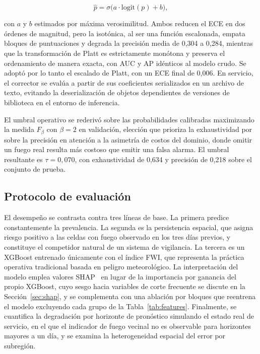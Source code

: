 \documentclass[11pt,a4paper]{article}
\begin{document}
\begin{equation}
\hat{p} = \sigma\!\bigl(a \cdot \mathrm{logit}(p) + b\bigr),
\label{eq:platt}
\end{equation}

\noindent con $a$ y $b$ estimados por máxima verosimilitud. Ambos reducen
el ECE en dos órdenes de magnitud, pero la isotónica, al ser una función
escalonada, empata bloques de puntuaciones y degrada la precisión media de
0,304 a 0,284, mientras que la transformación de Platt es estrictamente
monótona y preserva el ordenamiento de manera exacta, con AUC y AP
idénticos al modelo crudo. Se adoptó por lo tanto el escalado de Platt, con
un ECE final de 0,006. En servicio, el corrector se evalúa a partir de sus
coeficientes serializados en un archivo de texto, evitando la
deserialización de objetos dependientes de versiones de biblioteca en el
entorno de inferencia.

El umbral operativo se rederivó sobre las probabilidades calibradas
maximizando la medida $F_{\beta}$ con $\beta=2$ en validación, elección que
prioriza la exhaustividad por sobre la precisión en atención a la asimetría
de costos del dominio, donde omitir un fuego real resulta más costoso que
emitir una falsa alarma. El umbral resultante es $\tau = 0{,}070$, con
exhaustividad de 0,634 y precisión de 0,218 sobre el conjunto de prueba.

\subsection{Protocolo de evaluación}
\label{sec:protocolo}

El desempeño se contrasta contra tres líneas de base. La primera predice
constantemente la prevalencia. La segunda es la persistencia espacial, que
asigna riesgo positivo a las celdas con fuego observado en los tres días
previos, y constituye el competidor natural de un sistema de vigilancia.
La tercera es un XGBoost entrenado únicamente con el índice FWI, que
representa la práctica operativa tradicional basada en peligro
meteorológico. La interpretación del modelo emplea valores
SHAP~\cite{lundberg2017} en lugar de la importancia por ganancia del propio
XGBoost, cuyo sesgo hacia variables de corte frecuente se discute en la
Sección~\ref{sec:shap}, y se complementa con una ablación por bloques que
reentrena el modelo excluyendo cada grupo de la Tabla~\ref{tab:features}.
Finalmente, se cuantifica la degradación por horizonte de pronóstico
simulando el estado real de servicio, en el que el indicador de fuego
vecinal no es observable para horizontes mayores a un día, y se examina la
heterogeneidad espacial del error por subregión.
\end{document}
